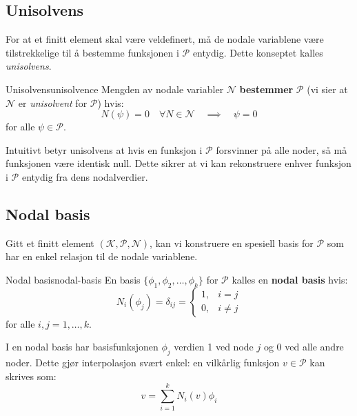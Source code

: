 \documentclass[../../main.tex]{subfiles}
\begin{document}
\subsection{Unisolvens}

For at et finitt element skal være veldefinert, må de nodale variablene være tilstrekkelige til å bestemme funksjonen i $\mathcal{P}$ entydig. Dette konseptet kalles \emph{unisolvens}.

\begin{definition}{Unisolvens}{unisolvence}
Mengden av nodale variabler $\mathcal{N}$ \textbf{bestemmer} $\mathcal{P}$ (vi sier at $\mathcal{N}$ er \emph{unisolvent} for $\mathcal{P}$) hvis:
\[
    N(\psi) = 0 \quad \forall N \in \mathcal{N} \quad \implies \quad \psi = 0
\]
for alle $\psi \in \mathcal{P}$.
\end{definition}

\begin{remark}{}{}
Intuitivt betyr unisolvens at hvis en funksjon i $\mathcal{P}$ forsvinner på alle noder, så må funksjonen være identisk null. Dette sikrer at vi kan rekonstruere enhver funksjon i $\mathcal{P}$ entydig fra dens nodalverdier.
\end{remark}

\subsection{Nodal basis}

Gitt et finitt element $(\mathcal{K}, \mathcal{P}, \mathcal{N})$, kan vi konstruere en spesiell basis for $\mathcal{P}$ som har en enkel relasjon til de nodale variablene.

\begin{definition}{Nodal basis}{nodal-basis}
En basis $\{\phi_1, \phi_2, \ldots, \phi_k\}$ for $\mathcal{P}$ kalles en \textbf{nodal basis} hvis:
\[
    N_i(\phi_j) = \delta_{ij} = \begin{cases}
        1, & i = j \\
        0, & i \neq j
    \end{cases}
\]
for alle $i, j = 1, \ldots, k$.
\end{definition}

\begin{remark}{}{}
I en nodal basis har basisfunksjonen $\phi_j$ verdien 1 ved node $j$ og 0 ved alle andre noder. Dette gjør interpolasjon svært enkel: en vilkårlig funksjon $v \in \mathcal{P}$ kan skrives som:
\[
    v = \sum_{i=1}^k N_i(v) \phi_i
\]
\end{remark}
\end{document}
